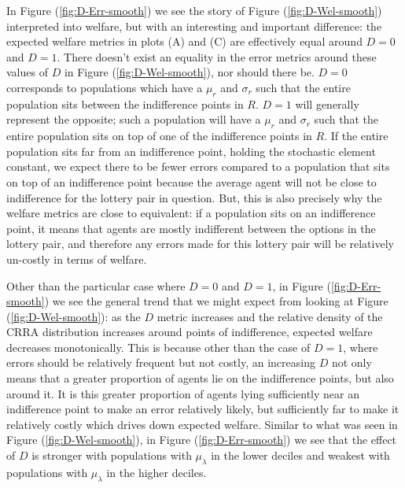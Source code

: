 \documentclass[11pt,a4paper]{article} %
\begin{document}
In Figure (\ref{fig:D-Err-smooth}) we see the story of Figure (\ref{fig:D-Wel-smooth}) interpreted into welfare, but with an interesting and important difference: the expected welfare metrics in plots (A) and (C) are effectively equal around $D=0$ and $D=1$.
There doesn't exist an equality in the error metrics around these values of $D$ in Figure (\ref{fig:D-Wel-smooth}), nor should there be.
$D=0$ corresponds to populations which have a $\mu_r$ and $\sigma_r$ such that the entire population sits between the indifference points in $R$.
$D=1$ will generally{\footnotemark} represent the opposite; such a population will have a $\mu_r$ and $\sigma_r$ such that the entire population sits on top of one of the indifference points in $R$.
If the entire population sits far from an indifference point, holding the stochastic element constant, we expect there to be fewer errors compared to a population that sits on top of an indifference point because the average agent will not be close to indifference for the lottery pair in question.
But, this is also precisely why the welfare metrics are close to equivalent: if a population sits on an indifference point, it means that agents are mostly indifferent between the options in the lottery pair, and therefore any errors made for this lottery pair will be relatively un-costly in terms of welfare.

\addtocounter{footnote}{-1}

Other than the particular case where $D=0$ and $D=1$, in Figure (\ref{fig:D-Err-smooth}) we see the general trend that we might expect from looking at Figure (\ref{fig:D-Wel-smooth}): as the $D$ metric increases and the relative density of the CRRA distribution increases around points of indifference, expected welfare decreases monotonically.
This is because other than the case of $D=1$, where errors should be relatively frequent but not costly, an increasing $D$ not only means that a greater proportion of agents lie on the indifference points, but also around it.
It is this greater proportion of agents lying sufficiently near an indifference point to make an error relatively likely, but sufficiently far to make it relatively costly which drives down expected welfare.
Similar to what was seen in Figure (\ref{fig:D-Wel-smooth}), in Figure (\ref{fig:D-Err-smooth}) we see that the effect of $D$ is stronger with populations with $\mu_\lambda$ in the lower deciles and weakest with populations with $\mu_\lambda$ in the higher deciles.
\end{document}

